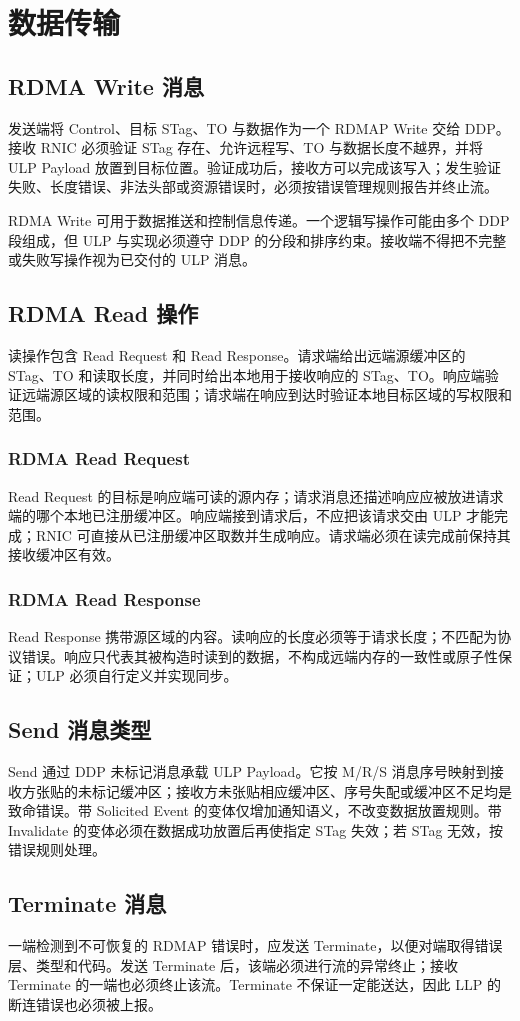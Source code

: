 \documentclass[11pt,a4paper]{article}
\begin{document}
\section{数据传输}
\subsection{RDMA Write 消息}
发送端将 Control、目标 STag、TO 与数据作为一个 RDMAP Write 交给 DDP。接收 RNIC 必须验证 STag 存在、允许远程写、TO 与数据长度不越界，并将 ULP Payload 放置到目标位置。验证成功后，接收方可以完成该写入；发生验证失败、长度错误、非法头部或资源错误时，必须按错误管理规则报告并终止流。

RDMA Write 可用于数据推送和控制信息传递。一个逻辑写操作可能由多个 DDP 段组成，但 ULP 与实现必须遵守 DDP 的分段和排序约束。接收端不得把不完整或失败写操作视为已交付的 ULP 消息。
\subsection{RDMA Read 操作}
读操作包含 Read Request 和 Read Response。请求端给出远端源缓冲区的 STag、TO 和读取长度，并同时给出本地用于接收响应的 STag、TO。响应端验证远端源区域的读权限和范围；请求端在响应到达时验证本地目标区域的写权限和范围。
\subsubsection{RDMA Read Request}
Read Request 的目标是响应端可读的源内存；请求消息还描述响应应被放进请求端的哪个本地已注册缓冲区。响应端接到请求后，不应把该请求交由 ULP 才能完成；RNIC 可直接从已注册缓冲区取数并生成响应。请求端必须在读完成前保持其接收缓冲区有效。
\subsubsection{RDMA Read Response}
Read Response 携带源区域的内容。读响应的长度必须等于请求长度；不匹配为协议错误。响应只代表其被构造时读到的数据，不构成远端内存的一致性或原子性保证；ULP 必须自行定义并实现同步。
\subsection{Send 消息类型}
Send 通过 DDP 未标记消息承载 ULP Payload。它按 M/R/S 消息序号映射到接收方张贴的未标记缓冲区；接收方未张贴相应缓冲区、序号失配或缓冲区不足均是致命错误。带 Solicited Event 的变体仅增加通知语义，不改变数据放置规则。带 Invalidate 的变体必须在数据成功放置后再使指定 STag 失效；若 STag 无效，按错误规则处理。
\subsection{Terminate 消息}
一端检测到不可恢复的 RDMAP 错误时，应发送 Terminate，以便对端取得错误层、类型和代码。发送 Terminate 后，该端必须进行流的异常终止；接收 Terminate 的一端也必须终止该流。Terminate 不保证一定能送达，因此 LLP 的断连错误也必须被上报。
\end{document}
